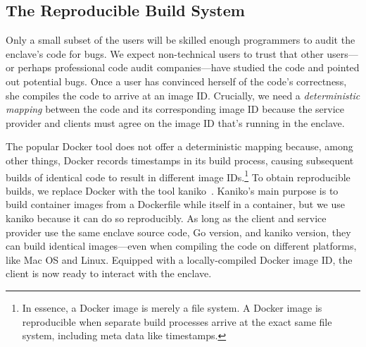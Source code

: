 

\subsection{The Reproducible Build System}
\label{sec:build-system}

Only a small subset of the users will be skilled enough programmers to audit
the enclave's code for bugs.  We expect non-technical users to trust that other
users---or perhaps professional code audit companies---have studied the code
and pointed out potential bugs.  Once a user has convinced herself of the code's
correctness, she compiles the code to arrive at an image ID.  Crucially, we
need a \emph{deterministic mapping} between the code and its corresponding
image ID because the service provider and clients must agree on the image ID
that's running in the enclave.

The popular Docker tool does not offer a deterministic mapping because, among
other things, Docker records timestamps in its build process, causing subsequent
builds of identical code to result in different image IDs.\footnote{In essence,
a Docker image is merely a file system.  A Docker image is reproducible when
separate build processes arrive at the exact same file system, including meta
data like timestamps.}  To obtain reproducible builds, we replace Docker with
the tool kaniko~\cite{kaniko}.  Kaniko's main purpose is to build container
images from a Dockerfile while itself in a container, but we use kaniko because
it can do so reproducibly.  As long as the client and service provider use the
same enclave source code, Go version, and kaniko version, they can build
identical images---even when compiling the code on different platforms, like Mac
OS and Linux.  Equipped with a locally-compiled Docker image ID, the client is
now ready to interact with the enclave.

